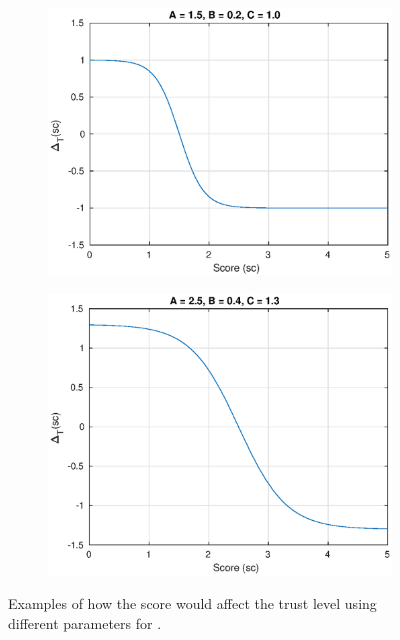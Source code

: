 \begin{figure}[!htbp]
  \begin{subfigure}[b]{0.5\textwidth}
    \includegraphics[width=\textwidth, height= 0.3\textheight]{figures/sigmoid1.eps}
    \label{fig:sigmoid1}
  \end{subfigure}
  \hfill
  \begin{subfigure}[b]{0.5\textwidth}
    \includegraphics[width=\textwidth, height=0.3\textheight]{figures/sigmoid3.eps}
    \label{fig:sigmoid2}
  \end{subfigure}
  \caption{Examples of how the score would affect the trust level using different parameters for .}
  \label{fig:sigmoids}
\end{figure}

